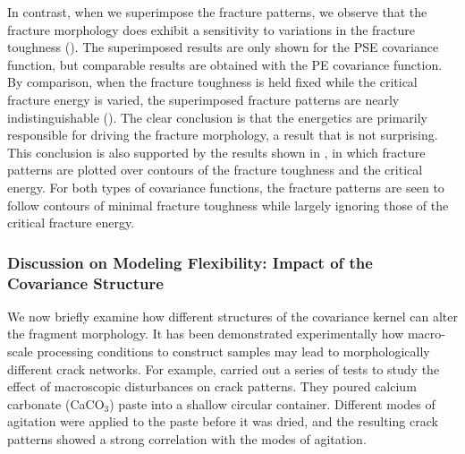 In contrast, when we superimpose the fracture patterns, we observe that the fracture morphology does exhibit a sensitivity to variations in the fracture toughness  (). The superimposed results are only shown for the PSE covariance function, but comparable results are obtained with the PE covariance function.
By comparison, when the fracture toughness is held fixed while the critical fracture energy is varied, the superimposed fracture patterns are nearly indistinguishable (). The clear conclusion is that the energetics are primarily responsible for driving the fracture morphology, a result that is not surprising. This conclusion is also supported by the results shown in , in which fracture patterns are plotted over contours of the fracture toughness and the critical energy. For both types of covariance functions, the fracture patterns are seen to follow contours of minimal fracture toughness while largely ignoring those of the critical fracture energy.





\subsubsection{Discussion on Modeling Flexibility: Impact of the Covariance Structure}

We now briefly examine how different structures of the covariance kernel can alter the fragment morphology. It has been demonstrated experimentally \cite{kitsunezaki2016shaking, kitsunezaki2017stress, halasz2017effect, kitsunezaki2017memory, nakahara2018mechanism}
how macro-scale processing conditions to construct samples may lead to morphologically different crack networks.  For example, \citet{kitsunezaki2017memory} carried out a series of tests to study the effect of macroscopic disturbances on crack patterns. They poured calcium carbonate (CaCO$_3$) paste into a shallow circular container. Different modes of agitation were applied to the paste before it was dried, and the resulting crack patterns showed a strong correlation with the modes of agitation.

